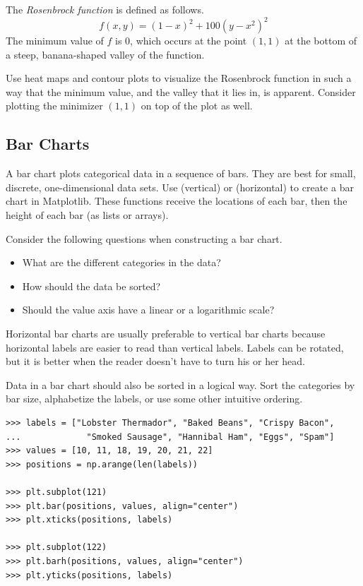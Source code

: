 \begin{problem} %
The \emph{Rosenbrock function} is defined as follows.
\[f(x,y) = (1-x)^2 + 100(y-x^2)^2\]
The minimum value of $f$ is $0$, which occurs at the point $(1,1)$ at the bottom of a steep, banana-shaped valley of the function.

Use heat maps and contour plots to visualize the Rosenbrock function in such a way that the minimum value, and the valley that it lies in, is apparent.
Consider plotting the minimizer $(1,1)$ on top of the plot as well.
\end{problem}

\subsection*{Bar Charts} %

A bar chart plots categorical data in a sequence of bars.
They are best for small, discrete, one-dimensional data sets.
Use  (vertical) or  (horizontal) to create a bar chart in Matplotlib.
These functions receive the locations of each bar, then the height of each bar (as lists or arrays).

Consider the following questions when constructing a bar chart.

\begin{itemize}
    \item What are the different categories in the data?
    \item How should the data be sorted?
    \item Should the value axis have a linear or a logarithmic scale?
\end{itemize}

Horizontal bar charts are usually preferable to vertical bar charts because horizontal labels are easier to read than vertical labels.
Labels can be rotated, but it is better when the reader doesn't have to turn his or her head.

Data in a bar chart should also be sorted in a logical way.
Sort the categories by bar size, alphabetize the labels, or use some other intuitive ordering.

\newpage

\begin{lstlisting}
>>> labels = ["Lobster Thermador", "Baked Beans", "Crispy Bacon",
...             "Smoked Sausage", "Hannibal Ham", "Eggs", "Spam"]
>>> values = [10, 11, 18, 19, 20, 21, 22]
>>> positions = np.arange(len(labels))

>>> plt.subplot(121)
>>> plt.bar(positions, values, align="center")
>>> plt.xticks(positions, labels)

>>> plt.subplot(122)
>>> plt.barh(positions, values, align="center")
>>> plt.yticks(positions, labels)
\end{lstlisting}

